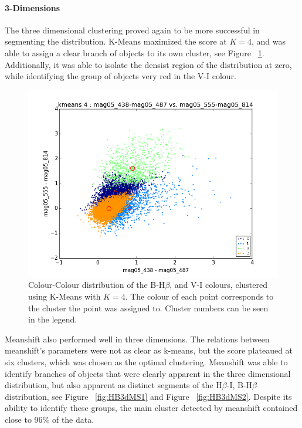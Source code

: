\paragraph{3-Dimensions}
The three dimensional clustering proved again to be more successful in segmenting the distribution. 
K-Means maximized the score at $K=4$, and was able to assign a clear branch of objects to its own cluster, see Figure ~\ref{fig:HBKM3d}.
Additionally, it was able to isolate the densist region of the distribution at zero, while identifying the group of objects very red in the V-I colour.

\begin{figure}
\centering
\includegraphics[width=\linewidth]{figs/kmeans_base_color_4cl_mag05_438-mag05_487vsmag05_555-mag05_814}
\caption{Colour-Colour distribution of the B-H$\beta$, and V-I colours, clustered using K-Means with $K=4$. The colour of each point corresponds to the cluster the point was assigned to. Cluster numbers can be seen in the legend.}
\label{fig:HBKM3d}
\end{figure}

Meanshift also performed well in three dimensions.
The relations between meanshift's parameters were not as clear as k-means, but the score plateaued at six clusters, which was chosen as the optimal clustering.
Meanshift was able to identify branches of objects that were clearly apparent in the three dimensional distribution, but also apparent as distinct segments of the H$\beta$-I, B-H$\beta$ distribution, see Figure ~\ref{fig:HB3dMS1} and Figure ~\ref{fig:HB3dMS2}.
Despite its ability to identify these groups, the main cluster detected by meanshift contained close to 96\% of the data.

